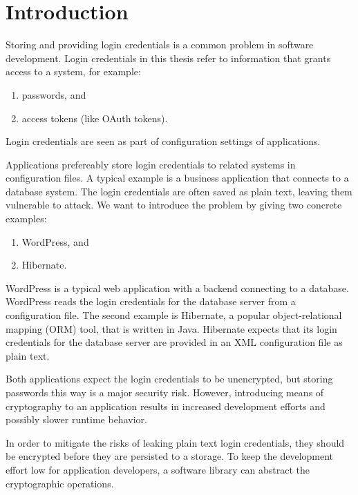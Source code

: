 \chapter{Introduction}

Storing and providing login credentials is a common problem in software development.
Login credentials in this thesis refer to information that grants access to a system, for example:

\begin{enumerate}
\item passwords, and
\item access tokens (like OAuth tokens).
\end{enumerate}

Login credentials are seen as part of configuration settings of applications.

Applications prefereably store login credentials to related systems in configuration files.
A typical example is a business application that connects to a database system.
The login credentials are often saved as plain text, leaving them vulnerable to attack.
We want to introduce the problem by giving two concrete examples:

\begin{enumerate}
\item WordPress, and
\item Hibernate.
\end{enumerate}

WordPress is a typical web application with a backend connecting to a database.
WordPress reads the login credentials for the database server from a configuration file.\cite{wordpress-doc}
The second example is Hibernate, a popular object-relational mapping (ORM) tool, that is written in Java.
Hibernate expects that its login credentials for the database server are provided in an XML configuration file as plain text.\cite{hibernate-doc}

Both applications expect the login credentials to be unencrypted, but storing passwords this way is a major security risk.
However, introducing means of cryptography to an application results in increased development efforts and possibly slower runtime behavior.

\label{intro-hypo-1}

In order to mitigate the risks of leaking plain text login credentials, they should be encrypted before they are persisted to a storage.
To keep the development effort low for application developers, a software library can abstract the cryptographic operations.

